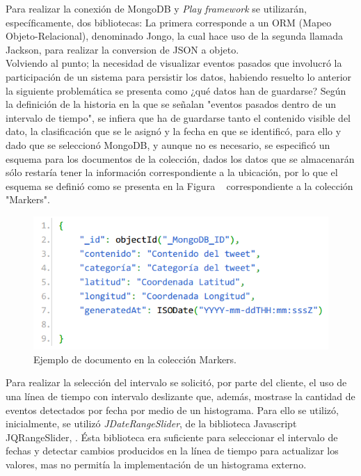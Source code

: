 Para realizar la conexión de MongoDB y \textit{Play framework} se utilizarán, específicamente, dos bibliotecas: La primera corresponde a un ORM (Mapeo Objeto-Relacional), denominado Jongo, la cual hace uso de la segunda llamada Jackson, para realizar la conversion de JSON a objeto.\\

Volviendo al punto; la necesidad de visualizar eventos pasados que involucró la participación de un sistema para persistir los datos, habiendo resuelto lo anterior la siguiente problemática se presenta como ¿qué datos han de guardarse? Según la definición de la historia en la que se señalan "eventos pasados dentro de un intervalo de tiempo", se infiera que ha de guardarse tanto el contenido visible del dato, la clasificación que se le asignó y la fecha en que se identificó, para ello y dado que se seleccionó MongoDB, y aunque no es necesario, se especificó un esquema para los documentos de la colección, dados los datos que se almacenarán sólo restaría tener la información correspondiente a la ubicación, por lo que el esquema se definió como se presenta en la Figura ~ correspondiente a la colección "Markers".

\begin{figure}[H]
	\centering
	\captionsetup{justification=centering}
	\includegraphics[scale=0.8]{images/Marker1.png}
	\caption[Ejemplo de documento en la colección Markers.]{Ejemplo de documento en la colección Markers.}
	\label{fig:esquemaMarker1}
\end{figure}

Para realizar la selección del intervalo se solicitó, por parte del cliente, el uso de una línea de tiempo con intervalo deslizante que, además, mostrase la cantidad de eventos detectados por fecha por medio de un histograma. Para ello se utilizó, inicialmente, se utilizó \textit{JDateRangeSlider}, de la biblioteca Javascript JQRangeSlider, \cite{JQRangeSlider}. Ésta biblioteca era suficiente para seleccionar el intervalo de fechas y detectar cambios producidos en la línea de tiempo para actualizar los valores, mas no permitía la implementación de un histograma externo.

